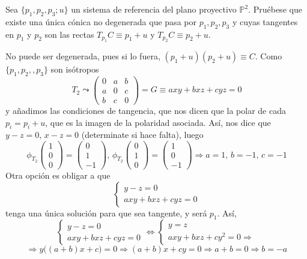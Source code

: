 \begin{ejer}
    [11] Sea $\{p_1, p_2, p_3; u\}$ un sistema de referencia del plano proyectivo $\mathbb P^2$. Pru\'ebese que existe una \'unica c\'onica no degenerada que pasa por $p_1, p_2, p_3$ y cuyas tangentes en $p_1$ y $p_2$ son las rectas $T_{p_1}C\equiv p_1 + u$ y $T_{p_2}C\equiv p_2 + u$. 
\end{ejer}
\begin{sol}
    No puede ser degenerada, pues si lo fuera, $(p_1+u)(p_2+u)\equiv C$. Como $\{p_1, p_2,,p_3\}$ son is\'otropos
    $$T_2\leadsto \begin{pmatrix}
        0 & a & b\\ a & 0 & c \\ b & c & 0  
    \end{pmatrix}=G \equiv axy+bxz+cyz=0$$
    y añadimos las condiciones de tangencia, que nos dicen que la polar de cada $p_i=p_i+u$, que es la imagen de la polaridad asociada. As\'i, nos dice que $y-z=0, \, x-z=0$ (determinate si hace falta), luego 
    $$\phi_{T_2} \begin{pmatrix}
        1 \\ 0 \\ 0
    \end{pmatrix}=\begin{pmatrix}
        0 \\ 1 \\ -1
    \end{pmatrix}, \, \phi_{T_2} \begin{pmatrix}
        0 \\ 1 \\ 0
    \end{pmatrix}=\begin{pmatrix}
        1 \\ 0 \\ -1
    \end{pmatrix}\Rightarrow a=1, \, b=-1, \, c=-1$$
    Otra opci\'on es obligar a que 
    $$\begin{cases}
        y-z=0 \\ axy+bxz+cyz=0
    \end{cases}$$
    tenga una \'unica soluci\'on para que sea tangente, y ser\'a $p_1$. As\'i, 
    $$\begin{cases}
        y-z=0 \\ axy+bxz+cyz=0
    \end{cases} \iff \begin{cases}
        y=z \\ axy+bxz+cy^2=0 \Rightarrow 
    \end{cases}$$
    $$\Rightarrow y\big((a+b)x+c\big)=0 \Rightarrow (a+b)x+cy=0 \Rightarrow a+b=0 \Rightarrow b=-a$$
\end{sol}
